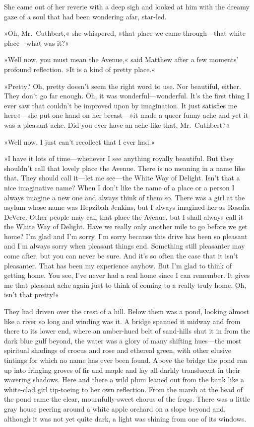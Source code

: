 She came out of her reverie with a deep sigh and looked at him with the dreamy gaze of a soul that had been wondering afar, star-led.

»Oh, Mr.~Cuthbert,« she whispered, »that place we came through—that white place—what was it?«

»Well now, you must mean the Avenue,« said Matthew after a few moments' profound reflection. »It is a kind of pretty place.«

»Pretty? Oh, pretty doesn't seem the right word to use. Nor beautiful, either. They don't go far enough. Oh, it was wonderful—wonderful. It's the first thing I ever saw that couldn't be improved upon by imagination. It just satisfies me here«—she put one hand on her breast—»it made a queer funny ache and yet it was a pleasant ache. Did you ever have an ache like that, Mr.~Cuthbert?«

»Well now, I just can't recollect that I ever had.«

»I have it lots of time—whenever I see anything royally beautiful. But they shouldn't call that lovely place the Avenue. There is no meaning in a name like that. They should call it—let me see—the White Way of Delight. Isn't that a nice imaginative name? When I don't like the name of a place or a person I always imagine a new one and always think of them so. There was a girl at the asylum whose name was Hepzibah Jenkins, but I always imagined her as Rosalia DeVere. Other people may call that place the Avenue, but I shall always call it the White Way of Delight. Have we really only another mile to go before we get home? I'm glad and I'm sorry. I'm sorry because this drive has been so pleasant and I'm always sorry when pleasant things end. Something still pleasanter may come after, but you can never be sure. And it's so often the case that it isn't pleasanter. That has been my experience anyhow. But I'm glad to think of getting home. You see, I've never had a real home since I can remember. It gives me that pleasant ache again just to think of coming to a really truly home. Oh, isn't that pretty!«

They had driven over the crest of a hill. Below them was a pond, looking almost like a river so long and winding was it. A bridge spanned it midway and from there to its lower end, where an amber-hued belt of sand-hills shut it in from the dark blue gulf beyond, the water was a glory of many shifting hues—the most spiritual shadings of crocus and rose and ethereal green, with other elusive tintings for which no name has ever been found. Above the bridge the pond ran up into fringing groves of fir and maple and lay all darkly translucent in their wavering shadows. Here and there a wild plum leaned out from the bank like a white-clad girl tip-toeing to her own reflection. From the marsh at the head of the pond came the clear, mournfully-sweet chorus of the frogs. There was a little gray house peering around a white apple orchard on a slope beyond and, although it was not yet quite dark, a light was shining from one of its windows.

